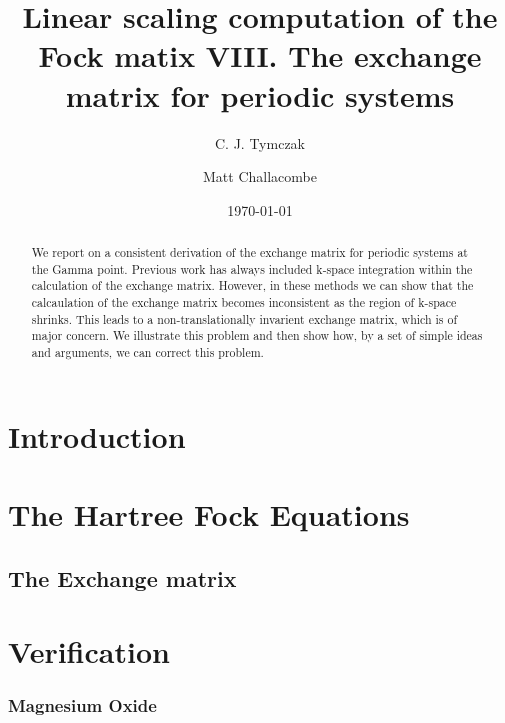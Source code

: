 \documentclass[prb,aps,nobibnotes,twocolumn,doublespace,twocolumngrid,superbib]{revtex4}
\begin{document}
\title{\textbf{Linear scaling computation of the Fock matix VIII. The exchange matrix
for periodic systems}}


\author{C. J. Tymczak}
\author{Matt Challacombe}


\date{\today}

\begin{abstract}
We report on a consistent derivation of the exchange matrix for periodic
systems at the Gamma point. Previous work has always included k-space integration 
within the calculation of the exchange matrix. However, in  these methods
we can show that the calcaulation of the exchange matrix becomes inconsistent as the
region of k-space shrinks. This leads to a non-translationally invarient exchange matrix,
which is of major concern. We illustrate this problem and then show how, by a set of
simple ideas and arguments, we can correct this problem.
\end{abstract}

\maketitle

\section{Introduction}



\section{The Hartree Fock Equations}


\subsection{The Exchange matrix}



\section{Verification}

\subsubsection{Magnesium Oxide}
\end{document}
